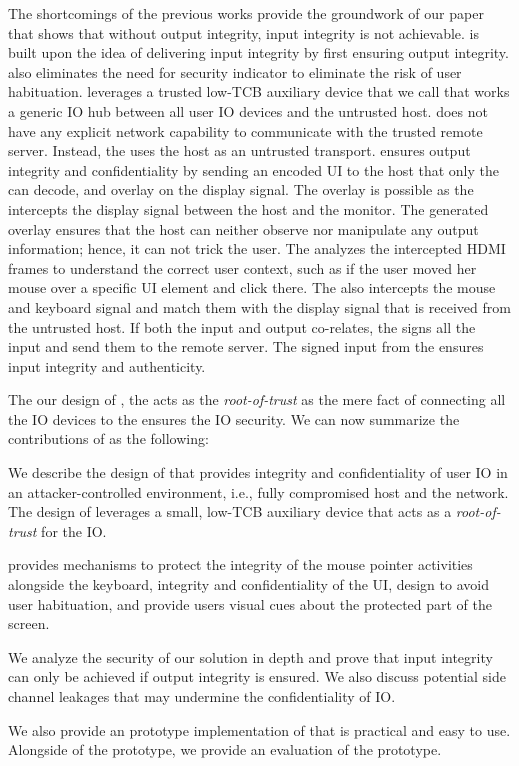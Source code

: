  
 The shortcomings of the previous works provide the groundwork of our paper that shows that without output integrity, input integrity is not achievable. \name is built upon the idea of delivering input integrity by first ensuring output integrity. \name also eliminates the need for security indicator to eliminate the risk of user habituation. \name leverages a trusted low-TCB auxiliary device that we call \device that works a generic IO hub between all user IO devices and the untrusted host. \device does not have any explicit network capability to communicate with the trusted remote server. Instead, the \device uses the host as an untrusted transport. \device ensures output integrity and confidentiality by sending an encoded UI to the host that only the \device can decode, and overlay on the display signal. The overlay is possible as the \device intercepts the display signal between the host and the monitor. The \device generated overlay ensures that the host can neither observe nor manipulate any output information; hence, it can not trick the user. The \device analyzes the intercepted HDMI frames to understand the correct user context, such as if the user moved her mouse over a specific UI element and click there. The \device also intercepts the mouse and keyboard signal and match them with the display signal that is received from the untrusted host. If both the input and output co-relates, the \device signs all the input and send them to the remote server. The signed input from the \device ensures input integrity and authenticity. 

The our design of \name, the \device acts as the \emph{root-of-trust} as the mere fact of connecting all the IO devices to the \device ensures the IO security. We can now summarize the contributions of \name as the following: 

\begin{mybullet}
  \item We describe the design of \name that provides integrity and confidentiality of user IO in an attacker-controlled environment, i.e., fully compromised host and the network. The design of \name leverages a small, low-TCB auxiliary device that acts as a \emph{root-of-trust} for the IO.
  \item \name provides mechanisms to protect the integrity of the mouse pointer activities alongside the keyboard, integrity and confidentiality of the UI, design to avoid user habituation, and provide users visual cues about the protected part of the screen. 
  \item We analyze the security of our solution in depth and prove that input integrity can only be achieved if output integrity is ensured. We also discuss potential side channel leakages that may undermine the confidentiality of IO. 
  \item We also provide an prototype implementation of \name that is practical and easy to use. Alongside of the prototype, we provide an evaluation of the prototype.
\end{mybullet}

